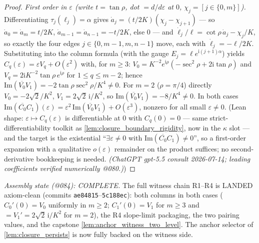 \begin{proof}
  \emph{First order in $\varepsilon$ (write $t = \tan\rho$, dot $=
  d/d\varepsilon$ at $0$, $\chi_j = [j \in \{0,m\}]$).} Differentiating
  $\tau_j(\ell_j) = \alpha$ gives
  $\dot a_j = (t/2K)(\chi_j - \chi_{j+1})$ --- so $\dot a_0 = \dot a_m =
  t/2K$, $\dot a_{m-1} = \dot a_{n-1} = -t/2K$, else $0$ --- and
  $\dot\ell_j/\ell = \cot\rho\,\dot a_j - \chi_j/K$, so exactly the four edges
  $j \in \{0, m{-}1, m, n{-}1\}$ move, each with $\dot\ell_j = -\ell/2K$.
  Substituting into the column formula (with the gauge
  $E_j = \ell e^{\mathrm{i}(j+1)\alpha}$) yields
  $C_q(\varepsilon) = \varepsilon V_q + O(\varepsilon^2)$ with, for $m \ge 3$:
  $V_0 = K^{-2}e^{\mathrm{i}\rho}(-\sec^2\rho + 2\mathrm{i}\tan\rho)$ and
  $V_q = 2\mathrm{i}K^{-2}\tan\rho\, e^{\mathrm{i}\rho}$ for
  $1 \le q \le m-2$; hence $\mathrm{Im}(\overline{V_0}V_1) =
  -2\tan\rho\sec^2\rho/K^4 \ne 0$. For $m = 2$ ($\rho = \pi/4$) directly
  $V_0 = -2\sqrt2/K^2$, $V_1 = 2\sqrt2\,\mathrm{i}/K^2$, so
  $\mathrm{Im}(\overline{V_0}V_1) = -8/K^4 \ne 0$. In both cases
  $\mathrm{Im}(\overline{C_0}C_1)(\varepsilon) = \varepsilon^2\,
  \mathrm{Im}(\overline{V_0}V_1) + O(\varepsilon^3)$, nonzero for all small
  $\varepsilon \ne 0$. (Lean shape: $\varepsilon \mapsto C_q(\varepsilon)$ is
  differentiable at $0$ with $C_q(0) = 0$ --- same strict-differentiability
  toolkit as \cref{lem:closure_boundary_rigidity}, now in the $\kappa$ slot ---
  and the target is the existential ``$\exists \varepsilon \ne 0$ with
  $\mathrm{Im}(\overline{C_0}C_1) \ne 0$'', so a first-order expansion with a
  qualitative $o(\varepsilon)$ remainder on the product suffices; no
  second-derivative bookkeeping is needed.
  \emph{(ChatGPT gpt-5.5 consult 2026-07-14; leading coefficients verified
  numerically @080.)})
\end{proof}

\emph{Assembly state (@084): COMPLETE.} The full witness chain R1--R4 is
LANDED axiom-clean (commits \texttt{ae84815}--\texttt{5c188ec}): both columns
in both cases ($C_0'(0) = V_0$ uniformly in $m \ge 2$; $C_1'(0) = V_1$ for
$m \ge 3$ and $= V_1' = 2\sqrt2\,\mathrm{i}/K^2$ for $m = 2$), the R4
slope-limit packaging, the two pairing values, and the capstone
\cref{lem:anchor_witness_two_level}. The anchor selector of
\cref{lem:closure_persists} is now fully backed on the witness side.

